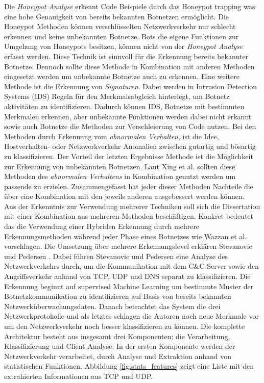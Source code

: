 Die \textit{Honeypot Analyse} erkennt Code Beispiele durch das Honeypot trapping was eine hohe Genauigkeit von bereits bekannten Botnetzen ermöglicht. Die Honeypot Methoden können
verschlüsselten Netzwerkverkehr nur schlecht erkennen und keine unbekannten Botnetze. Bots die eigene Funktionen zur Umgehung von Honeypots besitzen, können nicht von der \textit{Honeypot 
Analyse} erfasst werden. Diese Technik ist sinnvoll für die Erkennung bereits bekannter Botnetze. Dennoch sollte
diese Methode in Kombination mit anderen Methoden eingesetzt werden um unbekannte Botnetze auch zu erkennen. Eine weitere Methode ist die Erkennung von \textit{Signaturen}. Dabei 
werden in Intrusion Detection Systems (IDS) Regeln für den Merkmalsabgleich hinterlegt, um Botnetz aktivitäten zu identifizieren. Dadurch können IDS, Botnetze mit bestimmten Merkmalen 
erkennen, aber unbekannte Funktionen werden dabei nicht erkannt sowie auch Botnetze die Methoden zur Verschleierung von Code nutzen. Bei den Methoden durch Erkennung vom
\textit{abnormalen Verhalten}, ist die Idee, Hostverhalten- oder Netzwerkverkehr Anomalien zwischen gutartig und bösartig zu klassifizieren. Der Vorteil der letzten Ergebnisse
Methode ist die Möglichkeit zur Erkennung von unbekannten Botnetzen. Laut Xing et al. sollten diese Methoden des \textit{abnormalen Verhaltens} in Kombination genutzt werden um passende 
 zu erzielen. Zusammengefasst hat jeder dieser Methoden Nachteile die über eine Kombination mit den jeweils anderen ausgebessert werden können. \\ Aus der Erkenntnis zur Verwendung mehrerer Techniken 
soll sich die Dissertation mit einer Kombination aus mehreren Methoden beschäftigen. Konkret bedeutet das die Verwendung einer Hybriden Erkennung durch mehrere Erkennungsmethoden während jeder Phase 
eines Botnetzes wie Wazzan et al. \cite{Wazzan2021InternetOT} vorschlagen. Die Umsetzung über mehrere Erkennungslevel erklären Stevanovic und Pedersen \cite{DBLP:journals/ijcysa/StevanovicP16}. 
Dabei führen Stevanovic und Pedersen eine Analyse des Netzwerkverkehrs durch, um die Kommunikation mit dem C\&C-Server sowie den Angriffsverkehr anhand von TCP, UDP und DNS separat zu klassifizieren. 
Die Erkennung beginnt auf supervised Machine Learning um bestimmte Muster der Botnetzkommunikation zu identifizieren auf Basis von bereits bekannten Netzwerküberwachungsdaten. Danach betrachtet das
System die drei Netzwerkprotokolle und als letztes schlagen die Autoren noch neue Merkmale vor um den Netzwerkverkehr noch besser klassifizieren zu können. Die komplette Architektur 
besteht aus insgesamt drei Komponenten: die Verarbeitung, Klassifizierung und Client Analyse. In der ersten Komponente werden der Netzwerkverkehr verarbeitet, durch Analyse und Extraktion anhand von 
statistischen Funktionen. Abbildung \ref{fig:stats_features} zeigt eine Liste mit den extrahierten Informationen aus TCP und UDP. 

